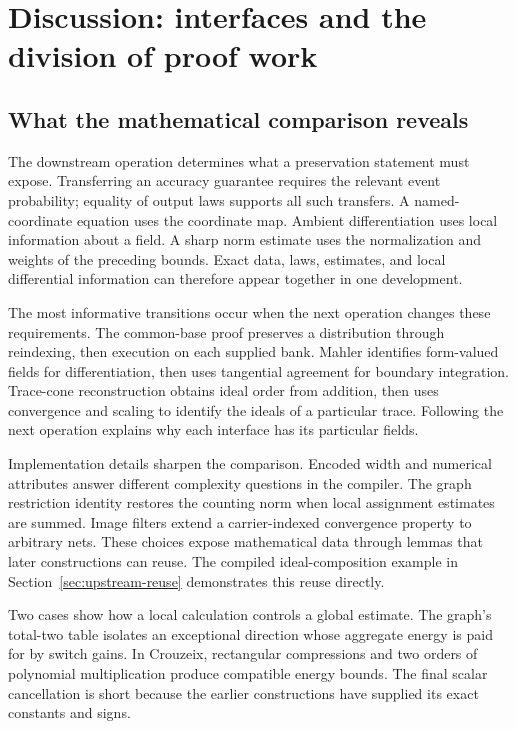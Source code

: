 \section{Discussion: interfaces and the division of proof work}
\label{sec:discussion}

\subsection{What the mathematical comparison reveals}

The downstream operation determines what a preservation statement must
expose. Transferring an accuracy guarantee requires the relevant event
probability; equality of output laws supports all such transfers.
A named-coordinate equation uses the coordinate map. Ambient
differentiation uses local information about a field. A sharp norm
estimate uses the normalization and weights of the preceding bounds.
Exact data, laws, estimates, and local differential information can
therefore appear together in one development.

The most informative transitions occur when the next operation changes
these requirements. The common-base proof preserves a distribution
through reindexing, then execution on each supplied bank. Mahler
identifies form-valued fields for differentiation, then uses tangential
agreement for boundary integration. Trace-cone reconstruction obtains
ideal order from addition, then uses convergence and scaling to identify
the ideals of a particular trace. Following the next operation explains
why each interface has its particular fields.

Implementation details sharpen the comparison. Encoded width and
numerical attributes answer different complexity questions in the
compiler. The graph restriction identity restores the counting norm
when local assignment estimates are summed. Image filters extend a
carrier-indexed convergence property to arbitrary nets. These choices
expose mathematical data through lemmas that later constructions can
reuse. The compiled ideal-composition example in
Section~\ref{sec:upstream-reuse} demonstrates this reuse directly.

Two cases show how a local calculation controls a global estimate.
The graph's total-two table isolates an exceptional direction whose
aggregate energy is paid for by switch gains. In Crouzeix, rectangular
compressions and two orders of polynomial multiplication produce
compatible energy bounds. The final scalar cancellation is short because
the earlier constructions have supplied its exact constants and signs.

